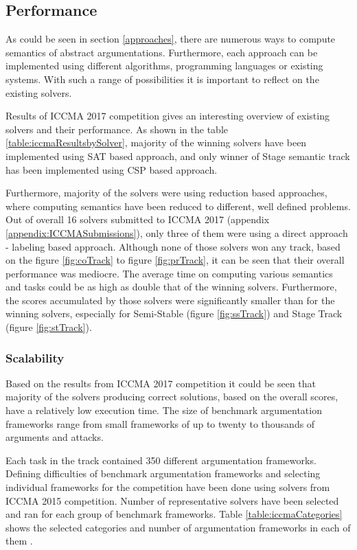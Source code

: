 \subsection{Performance}
As could be seen in section \ref{approaches}, there are numerous ways to compute semantics of abstract argumentations. Furthermore, each approach can be implemented using different algorithms, programming languages or existing systems. With such a range of possibilities it is important to reflect on the existing solvers.

Results of ICCMA 2017 competition \citep{iccmaResults} gives an interesting overview of existing solvers and their performance. As shown in the table \ref{table:iccmaResultsbySolver}, majority of the winning solvers have been implemented using SAT based approach, and only winner of Stage semantic track has been implemented using CSP based approach. 

Furthermore, majority of the solvers were using reduction based approaches, where computing semantics have been reduced to different, well defined problems. Out of overall 16 solvers submitted to ICCMA 2017 (appendix \ref{appendix:ICCMASubmissions}), only three of them were using a direct approach - labeling based approach. Although none of those solvers won any track, based on the figure \ref{fig:coTrack} to figure \ref{fig:prTrack}, it can be seen that their overall performance was mediocre. The average time on computing various semantics and tasks could be as high as double that of the winning solvers. Furthermore, the scores accumulated by those solvers were significantly smaller than for the winning solvers, especially for Semi-Stable (figure \ref{fig:ssTrack}) and Stage Track (figure \ref{fig:stTrack}).


\subsubsection{Scalability}
Based on the results from ICCMA 2017 competition it could be seen that majority of the solvers producing correct solutions, based on the overall scores, have a relatively low execution time. The size of benchmark argumentation frameworks range from small frameworks of up to twenty to thousands of arguments and attacks.

Each task in the track contained 350 different argumentation frameworks. Defining difficulties of benchmark argumentation frameworks and selecting individual frameworks for the competition have been done using solvers from ICCMA 2015 competition. Number of representative solvers have been selected and ran for each group of benchmark frameworks. Table \ref{table:iccmaCategories} shows the selected categories and number of argumentation frameworks in each of them \citep{results_sildes}.

